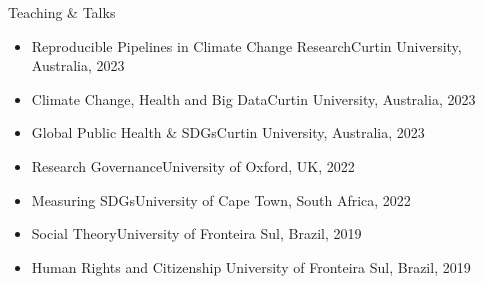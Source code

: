 \begin{rSection}{Teaching \& Talks}
\begin{itemize}
\item{Reproducible Pipelines in Climate Change Research}\hfill{Curtin University, Australia, 2023}
\item{Climate Change, Health and Big Data}\hfill{Curtin University, Australia, 2023}
\item{Global Public Health \& SDGs}\hfill{Curtin University, Australia,  2023}
\item{Research Governance}\hfill{University of Oxford, UK, 2022}
\item{Measuring SDGs}\hfill{University of Cape Town, South Africa, 2022}
\item{Social Theory}\hfill{University of Fronteira Sul, Brazil, 2019}
\item{Human Rights and Citizenship }\hfill{University of Fronteira Sul, Brazil, 2019}
\end{itemize}
\end{rSection}